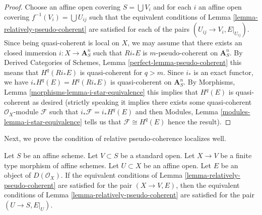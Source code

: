 \begin{proof}
Choose an affine open covering $S = \bigcup V_i$ and
for each $i$ an affine open covering $f^{-1}(V_i) = \bigcup U_{ij}$
such that the equivalent conditions of
Lemma \ref{lemma-relatively-pseudo-coherent}
are satisfied for each of the pairs $(U_{ij} \to V_i, E|_{U_{ij}})$.
Since being quasi-coherent is local on $X$, we may assume
that there exists an closed immersion $i : X \to \mathbf{A}^n_S$
such that $Ri_*E$ is $m$-pseudo-coherent on $\mathbf{A}^n_S$.
By Derived Categories of Schemes, Lemma \ref{perfect-lemma-pseudo-coherent}
this means that $H^q(Ri_*E)$ is quasi-coherent for $q > m$.
Since $i_*$ is an exact functor, we have $i_*H^q(E) = H^q(Ri_*E)$
is quasi-coherent on $\mathbf{A}^n_S$.
By Morphisms, Lemma \ref{morphisms-lemma-i-star-equivalence}
this implies that $H^q(E)$ is quasi-coherent as desired
(strictly speaking it implies there exists some quasi-coherent
$\mathcal{O}_X$-module $\mathcal{F}$ such that
$i_*\mathcal{F} = i_*H^q(E)$ and then
Modules, Lemma \ref{modules-lemma-i-star-equivalence}
tells us that $\mathcal{F} \cong H^q(E)$ hence the result).
\end{proof}

\noindent
Next, we prove the condition of relative pseudo-coherence localizes well.

\begin{lemma}
\label{lemma-localize-relative-pseudo-coherent}
Let $S$ be an affine scheme. Let $V \subset S$ be a standard open.
Let $X \to V$ be a finite type morphism of affine schemes.
Let $U \subset X$ be an affine open. Let $E$ be an object of
$D(\mathcal{O}_X)$. If the equivalent conditions of
Lemma \ref{lemma-relatively-pseudo-coherent}
are satisfied for the pair $(X \to V, E)$, then
the equivalent conditions of
Lemma \ref{lemma-relatively-pseudo-coherent}
are satisfied for the pair $(U \to S, E|_U)$.
\end{lemma}

